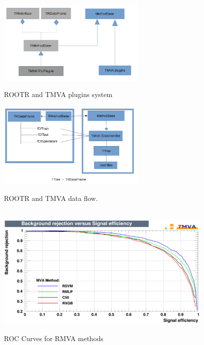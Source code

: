 \documentclass[a4paper]{jpconf}
\begin{document}
\begin{figure}[h]
\centering
\begin{minipage}{15pc}
\includegraphics[width=17pc]{img/rmvaplugins.png}
\caption{\label{rmvaplug}ROOTR and TMVA plugins system}
\end{minipage}\hspace{2pc}%
\begin{minipage}{15pc}
\includegraphics[width=17pc]{img/rmvadf.jpg}
\caption{\label{rmvadf}ROOTR and TMVA data flow.}
\end{minipage}\hspace{2pc}%
\vspace{2pc}%
\hspace*{\fill} \\
\includegraphics[width=25pc]{img/rmvaroc.png}\caption{\label{rmvaroc} ROC Curves for RMVA methods}
\end{figure}
\end{document}
